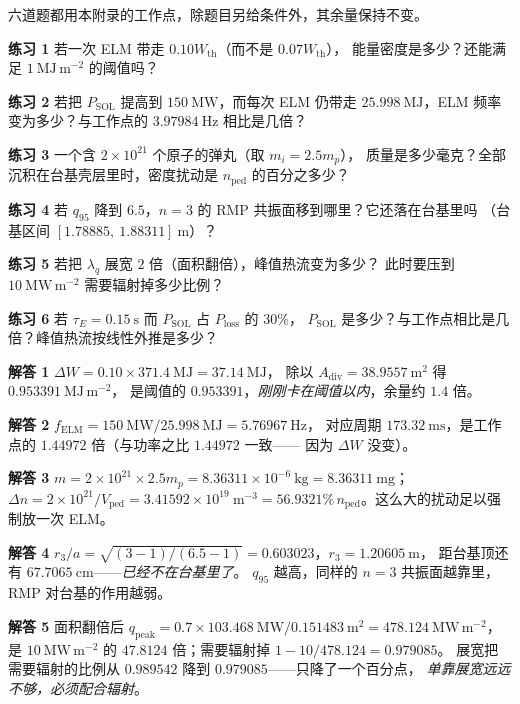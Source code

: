 六道题都用本附录的工作点，除题目另给条件外，其余量保持不变。

\textbf{练习 1} 若一次 ELM 带走 $0.10W_{\mathrm{th}}$（而不是 $0.07W_{\mathrm{th}}$），
能量密度是多少？还能满足 $1\ \mathrm{MJ\,m^{-2}}$ 的阈值吗？

\textbf{练习 2} 若把 $P_{\mathrm{SOL}}$ 提高到 $150\ \mathrm{MW}$，而每次 ELM 仍带走
$25.998\ \mathrm{MJ}$，ELM 频率变为多少？与工作点的 $3.97984\ \mathrm{Hz}$ 相比是几倍？

\textbf{练习 3} 一个含 $2\times10^{21}$ 个原子的弹丸（取 $m_i=2.5m_p$），
质量是多少毫克？全部沉积在台基壳层里时，密度扰动是 $n_{\mathrm{ped}}$ 的百分之多少？

\textbf{练习 4} 若 $q_{95}$ 降到 $6.5$，$n=3$ 的 RMP 共振面移到哪里？它还落在台基里吗
（台基区间 $[1.78885,\ 1.88311]\ \mathrm{m}$）？

\textbf{练习 5} 若把 $\lambda_q$ 展宽 $2$ 倍（面积翻倍），峰值热流变为多少？
此时要压到 $10\ \mathrm{MW\,m^{-2}}$ 需要辐射掉多少比例？

\textbf{练习 6} 若 $\tau_E=0.15\ \mathrm{s}$ 而 $P_{\mathrm{SOL}}$ 占 $P_{\mathrm{loss}}$ 的 $30\%$，
$P_{\mathrm{SOL}}$ 是多少？与工作点相比是几倍？峰值热流按线性外推是多少？

\textbf{解答 1} $\Delta W=0.10\times371.4\ \mathrm{MJ}=37.14\ \mathrm{MJ}$，
除以 $A_{\mathrm{div}}=38.9557\ \mathrm{m^2}$ 得 $0.953391\ \mathrm{MJ\,m^{-2}}$，
是阈值的 $0.953391$，\emph{刚刚卡在阈值以内}，余量约 $1.4$ 倍。

\textbf{解答 2} $f_{\mathrm{ELM}}=150\ \mathrm{MW}/25.998\ \mathrm{MJ}=5.76967\ \mathrm{Hz}$，
对应周期 $173.32\ \mathrm{ms}$，是工作点的 $1.44972$ 倍（与功率之比 $1.44972$ 一致——
因为 $\Delta W$ 没变）。

\textbf{解答 3} $m=2\times10^{21}\times2.5m_p=8.36311\times10^{-6}\ \mathrm{kg}=8.36311\ \mathrm{mg}$；
$\Delta n=2\times10^{21}/V_{\mathrm{ped}}=3.41592\times10^{19}\ \mathrm{m^{-3}}
=56.9321\%\,n_{\mathrm{ped}}$。这么大的扰动足以强制放一次 ELM。

\textbf{解答 4} $r_3/a=\sqrt{(3-1)/(6.5-1)}=0.603023$，$r_3=1.20605\ \mathrm{m}$，
距台基顶还有 $67.7065\ \mathrm{cm}$——\emph{已经不在台基里了}。
$q_{95}$ 越高，同样的 $n=3$ 共振面越靠里，RMP 对台基的作用越弱。

\textbf{解答 5} 面积翻倍后 $q_{\mathrm{peak}}=0.7\times103.468\ \mathrm{MW}
/0.151483\ \mathrm{m^2}=478.124\ \mathrm{MW\,m^{-2}}$，
是 $10\ \mathrm{MW\,m^{-2}}$ 的 $47.8124$ 倍；需要辐射掉 $1-10/478.124=0.979085$。
展宽把需要辐射的比例从 $0.989542$ 降到 $0.979085$——只降了一个百分点，
\emph{单靠展宽远远不够，必须配合辐射}。

